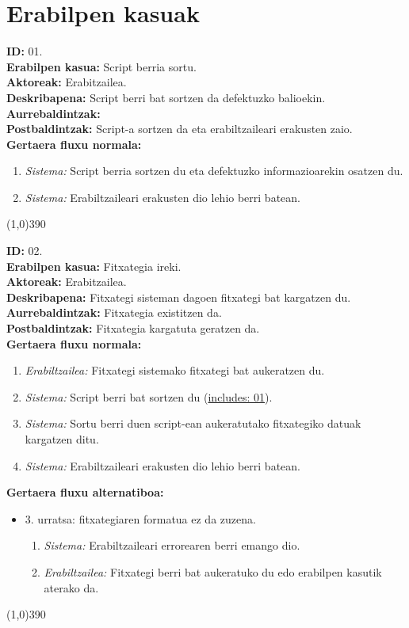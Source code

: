 \section{Erabilpen kasuak}

\noindent
\textbf{ID:} 01.\\
\textbf{Erabilpen kasua:} Script berria sortu.\\
\textbf{Aktoreak:} Erabitzailea.\\
\textbf{Deskribapena:} Script berri bat sortzen da defektuzko balioekin.\\
\textbf{Aurrebaldintzak:}\\
\textbf{Postbaldintzak:} Script-a sortzen da eta erabiltzaileari erakusten zaio.\\
\textbf{Gertaera fluxu normala:}
\begin{enumerate}
	\item \textit{Sistema:} Script berria sortzen du eta defektuzko informazioarekin osatzen du.
	\item \textit{Sistema:} Erabiltzaileari erakusten dio lehio berri batean.
\end{enumerate}
\line(1,0){390}

\noindent
\textbf{ID:} 02.\\
\textbf{Erabilpen kasua:} Fitxategia ireki.\\
\textbf{Aktoreak:} Erabitzailea.\\
\textbf{Deskribapena:} Fitxategi sisteman dagoen fitxategi bat kargatzen du.\\
\textbf{Aurrebaldintzak:} Fitxategia existitzen da.\\
\textbf{Postbaldintzak:} Fitxategia kargatuta geratzen da.\\
\textbf{Gertaera fluxu normala:}
\begin{enumerate}
	\item \textit{Erabiltzailea:} Fitxategi sistemako fitxategi bat aukeratzen du.
	\item \textit{Sistema:} Script berri bat sortzen du (\underline{includes: 01}).
	\item \textit{Sistema:} Sortu berri duen script-ean aukeratutako fitxategiko datuak kargatzen ditu.
	\item \textit{Sistema:} Erabiltzaileari erakusten dio lehio berri batean.
\end{enumerate}
\textbf{Gertaera fluxu alternatiboa:}
\begin{itemize}
	\item 3. urratsa: fitxategiaren formatua ez da zuzena.
		\begin{enumerate}
		\item \textit{Sistema:} Erabiltzaileari errorearen berri emango dio.
		\item \textit{Erabiltzailea:} Fitxategi berri bat aukeratuko du edo erabilpen kasutik aterako da.
		\end{enumerate}
\end{itemize}
\line(1,0){390}

